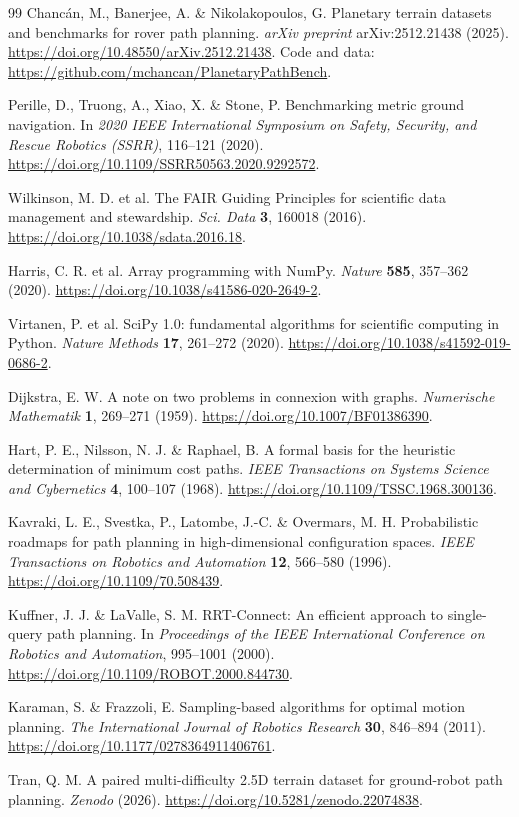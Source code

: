\documentclass[11pt]{article}
\begin{document}
\begin{thebibliography}{99}
Chanc\'{a}n, M., Banerjee, A. \& Nikolakopoulos, G. Planetary terrain datasets
and benchmarks for rover path planning. \textit{arXiv preprint}
arXiv:2512.21438 (2025).
\url{https://doi.org/10.48550/arXiv.2512.21438}.
Code and data: \url{https://github.com/mchancan/PlanetaryPathBench}.

Perille, D., Truong, A., Xiao, X. \& Stone, P. Benchmarking metric ground
navigation. In \textit{2020 IEEE International Symposium on Safety, Security,
and Rescue Robotics (SSRR)}, 116--121 (2020).
\url{https://doi.org/10.1109/SSRR50563.2020.9292572}.

Wilkinson, M. D. et al. The FAIR Guiding Principles for scientific data
management and stewardship. \textit{Sci. Data} \textbf{3}, 160018 (2016).
\url{https://doi.org/10.1038/sdata.2016.18}.

Harris, C. R. et al. Array programming with NumPy. \textit{Nature}
\textbf{585}, 357--362 (2020).
\url{https://doi.org/10.1038/s41586-020-2649-2}.

Virtanen, P. et al. SciPy 1.0: fundamental algorithms for scientific computing
in Python. \textit{Nature Methods} \textbf{17}, 261--272 (2020).
\url{https://doi.org/10.1038/s41592-019-0686-2}.

Dijkstra, E. W. A note on two problems in connexion with graphs.
\textit{Numerische Mathematik} \textbf{1}, 269--271 (1959).
\url{https://doi.org/10.1007/BF01386390}.

Hart, P. E., Nilsson, N. J. \& Raphael, B. A formal basis for the heuristic
determination of minimum cost paths. \textit{IEEE Transactions on Systems
Science and Cybernetics} \textbf{4}, 100--107 (1968).
\url{https://doi.org/10.1109/TSSC.1968.300136}.

Kavraki, L. E., Svestka, P., Latombe, J.-C. \& Overmars, M. H. Probabilistic
roadmaps for path planning in high-dimensional configuration spaces.
\textit{IEEE Transactions on Robotics and Automation} \textbf{12}, 566--580
(1996). \url{https://doi.org/10.1109/70.508439}.

Kuffner, J. J. \& LaValle, S. M. RRT-Connect: An efficient approach to
single-query path planning. In \textit{Proceedings of the IEEE International
Conference on Robotics and Automation}, 995--1001 (2000).
\url{https://doi.org/10.1109/ROBOT.2000.844730}.

Karaman, S. \& Frazzoli, E. Sampling-based algorithms for optimal motion
planning. \textit{The International Journal of Robotics Research} \textbf{30},
846--894 (2011). \url{https://doi.org/10.1177/0278364911406761}.

Tran, Q. M. A paired multi-difficulty 2.5D terrain dataset for ground-robot
path planning. \textit{Zenodo} (2026).
\url{https://doi.org/10.5281/zenodo.22074838}.

\end{thebibliography}
\end{document}
